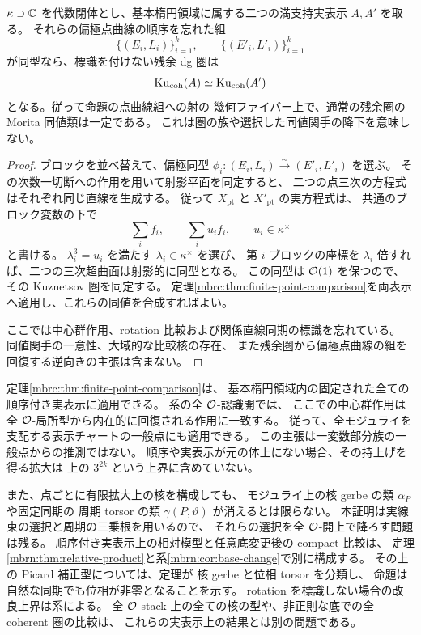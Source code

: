 \begin{corollary}[偏極点曲線の組を固定した幾何ファイバー]
\label{mbrc:cor:point-fiber-constancy}
$\kappa\supset\mathbb C$ を代数閉体とし、基本楕円領域に属する二つの満支持実表示
$A,A'$ を取る。
それらの偏極点曲線の順序を忘れた組
\[
 \{(E_i,L_i)\}_{i=1}^k,\qquad
 \{(E'_i,L'_i)\}_{i=1}^k
\]
が同型なら、標識を付けない残余 dg 圏は
\[
 \operatorname{Ku}_{\mathrm{coh}}(A)\simeq\operatorname{Ku}_{\mathrm{coh}}(A')
\]
となる。従って命題の点曲線組への射の
幾何ファイバー上で、通常の残余圏の Morita 同値類は一定である。
これは圏の族や選択した同値関手の降下を意味しない。
\end{corollary}
\begin{proof}
ブロックを並べ替えて、偏極同型
$\phi_i:(E_i,L_i)\xrightarrow{\sim}(E'_i,L'_i)$ を選ぶ。
その次数一切断への作用を用いて射影平面を同定すると、
二つの点三次の方程式はそれぞれ同じ直線を生成する。
従って $X_{\mathrm{pt}}$ と $X'_{\mathrm{pt}}$ の実方程式は、
共通のブロック変数の下で
\[
 \sum_i f_i,\qquad \sum_i u_i f_i,
 \qquad u_i\in\kappa^\times
\]
と書ける。
$\lambda_i^3=u_i$ を満たす $\lambda_i\in\kappa^\times$ を選び、
第 $i$ ブロックの座標を $\lambda_i$ 倍すれば、二つの三次超曲面は射影的に同型となる。
この同型は $\mathcal O(1)$ を保つので、その Kuznetsov 圏を同定する。
定理\ref{mbrc:thm:finite-point-comparison}を両表示へ適用し、これらの同値を合成すればよい。

ここでは中心群作用、rotation 比較および関係直線同期の標識を忘れている。
同値関手の一意性、大域的な比較核の存在、
また残余圏から偏極点曲線の組を回復する逆向きの主張は含まない。
\end{proof}

\begin{remark}[体値点の比較と大域障害]
\label{mbrc:rem:scope}
定理\ref{mbrc:thm:finite-point-comparison}は、
基本楕円領域内の固定された全ての順序付き実表示に適用できる。
系の全 $\mathcal O$-認識開では、
ここでの中心群作用は全 $\mathcal O$-局所型から内在的に回復される作用に一致する。
従って、全モジュライを支配する表示チャートの一般点にも適用できる。
この主張は一変数部分族の一般点からの推測ではない。
順序や実表示が元の体上にない場合、その持上げを得る拡大は
上の $3^{2k}$ という上界に含めていない。

また、点ごとに有限拡大上の核を構成しても、
モジュライ上の核 gerbe の類 $\alpha_P$ や固定同期の
周期 torsor の類 $\gamma(P,\vartheta)$ が消えるとは限らない。
本証明は実線束の選択と周期の三乗根を用いるので、
それらの選択を全 $\mathcal O$-開上で降ろす問題は残る。
順序付き実表示上の相対模型と任意底変更後の compact 比較は、
定理\ref{mbrn:thm:relative-product}と系\ref{mbrn:cor:base-change}で別に構成する。
その上の Picard 補正型については、定理が
核 gerbe と位相 torsor を分類し、
命題は自然な同期でも位相が非零となることを示す。
rotation を標識しない場合の改良上界は系による。
全 $\mathcal O$-stack 上の全ての核の型や、非正則な底での全 coherent 圏の比較は、
これらの実表示上の結果とは別の問題である。
\end{remark}
